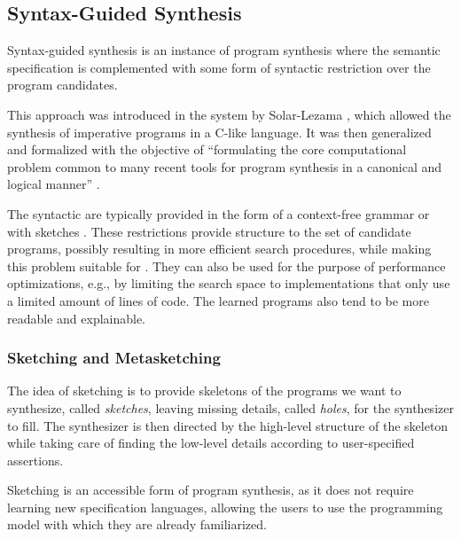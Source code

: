 \subsection{Syntax-Guided Synthesis}
\label{sec:syntax-guided}

Syntax-guided synthesis is an instance of program synthesis where the semantic
specification is complemented with some form of syntactic restriction over the
program candidates.

This approach was introduced in the  system by Solar-Lezama \cite{Solar-Lezama:2008}, which allowed the
synthesis of imperative programs in a C-like language.
It was then generalized and formalized with the objective of ``formulating the
core computational problem common to many recent tools for program synthesis in
a canonical and logical manner'' \cite{Alur:sygus:2013}.

The syntactic  are typically provided
in the form of a context-free grammar \cite{Alur:sygus:2013} or with sketches
\cite{Solar-Lezama:2008}. These restrictions provide structure to the set of
candidate programs, possibly resulting in more efficient search procedures,
while making this problem suitable for  \cite{Alur:sygus:2013}. They can also be used for
the purpose of performance optimizations, e.g., by limiting the search space to
implementations that only use a limited amount of lines of code. The learned
programs also tend to be more readable and explainable.

\subsubsection{Sketching and Metasketching}
\label{sec:sketching}

The idea of sketching is to provide skeletons of the programs we want to
synthesize, called \textit{sketches}, leaving missing details, called
\textit{holes}, for the synthesizer to fill.
The synthesizer is then directed by the high-level structure of the skeleton
while taking care of finding the low-level details according to user-specified
assertions.

Sketching is an accessible form of program synthesis, as it does not require
learning new specification languages, allowing the users to use the programming
model with which they are already familiarized.
